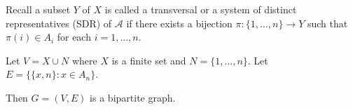 \documentclass[10pt]{article}
\begin{document}
\begin{solution}

Recall a subset \( Y \) of \( X \) is called a transversal or a system of distinct representatives (SDR) of \( \mathcal{A} \) if there exists a bijection \( \pi: \{1,\ldots,n\} \to Y \) such that \( \pi(i) \in A_i \) for each \( i=1,\ldots, n \).

\iffalse
Suppose \( \mathcal{A} \) has an SDR \( Y\subseteq X \). That is, there exists a bijection \( \pi: \{1,\ldots, n\} \to Y \) such that \( \pi(i) \in A_i \) for each \( i=1,\ldots, n \).

Fix a subset \( I \) of \( \{1,\ldots, n\} \). Then, since \( \pi \) is a bijection, the image of \( I \) under \( \pi \) is a set of \( |I| \) distinct points. Moreover, \( \pi(I) \subseteq \cup_{i\in I}A_i \) as \( \pi(i) \in A_i \) for each \( i\in I\subseteq \{1,\ldots, n\} \). Therefore,
\begin{align*}
    \left| \bigcup_{i\in I} A_i \right| \geq \pi(I) = \left| I \right| 
\end{align*}

Now, suppose that for any subset \( I \) of \( \{1,\ldots,n\} \),
\begin{align*}
    \left| \bigcup_{i\in I} A_i \right| \geq \left| I \right| 
\end{align*}

\textbf{some stuff with counting}

First note that for each \( i\in\{1,\ldots, n\} \),
\begin{align*}
    |A_i| \geq |\{ i\}| = 1
\end{align*}
That is, every \( A_i \) is nonempty.

\textbf{OBVIOUSLY THERE IS A GRAPH THEORY WAY TO DO THIS WHICH IS PROABABLY NICE..}


Now note, \( |\cup_{i\in I} A_i | \geq |\{1,\ldots,n\}| = n \). Therefore, there is an injection,
\begin{align*}
    \pi:\{1,\ldots, n\} \to \bigcup_{i\in I} A_i
\end{align*}
defined as,
\begin{align*}
    \pi(i) = a_i
\end{align*}

\fi

Let \( V = X\cup N \) where \( X \) is a finite set and \( N = \{1,\ldots, n\} \). Let \( E = \{ \{x,n\} : x\in A_n \}  \).

Then \( G = (V,E) \) is a bipartite graph.


\end{solution}
\end{document}
